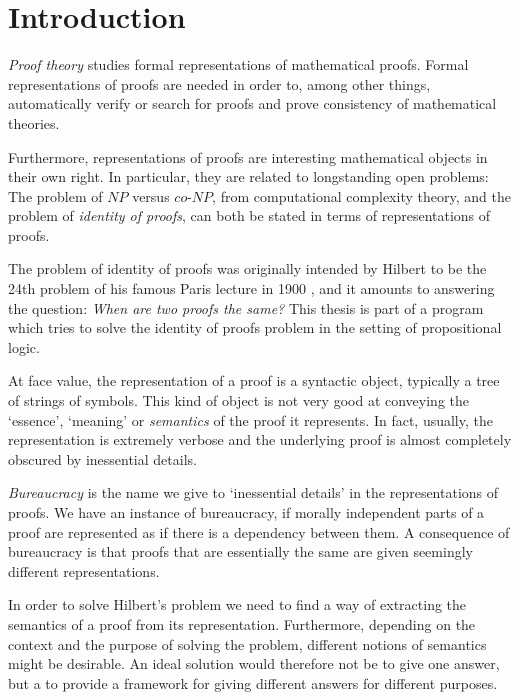 \chapter{Introduction}


\emph{Proof theory} studies formal representations of mathematical proofs. Formal representations of proofs are needed in order to, among other things, automatically verify or search for proofs and prove consistency of mathematical theories.

Furthermore, representations of proofs are interesting mathematical objects in their own right. In particular, they are related to longstanding open problems: The problem of $NP$ versus $co$-$NP$, from computational complexity theory, and the problem of \emph{identity of proofs}, can both be stated in terms of representations of proofs.

The problem of identity of proofs was originally intended by Hilbert to be the 24th problem of his famous Paris lecture in 1900 \cite{Thie:03:Hilberts:yu}, and it amounts to answering the question: \emph{When are two proofs the same?} This thesis is part of a program which tries to solve the identity of proofs problem in the setting of propositional logic.

At face value, the representation of a proof is a syntactic object, typically a tree of strings of symbols. This kind of object is not very good at conveying the `essence', `meaning' or \emph{semantics} of the proof it represents. In fact, usually, the representation is extremely verbose and the underlying proof is almost completely obscured by inessential details.

\emph{Bureaucracy} is the name we give to `inessential details' in the representations of proofs. We have an instance of  bureaucracy, if morally independent parts of a proof are represented as if there is a dependency between them. A consequence of bureaucracy is that proofs that are essentially the same are given seemingly different representations.

In order to solve Hilbert's problem we need to find a way of extracting the semantics of a proof from its representation. Furthermore, depending on the context and the purpose of solving the problem, different notions of semantics might be desirable. An ideal solution would therefore not be to give one answer, but a to provide a framework for giving different answers for different purposes.

